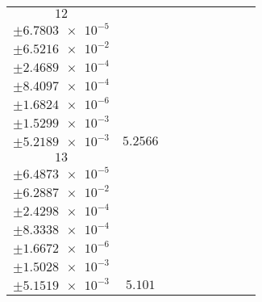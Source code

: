 \documentclass[8pt]{article}
\begin{document}
\begin{longtable}[l]{c c c c c c c c c}
$\num{12}$ & \begin{tabular}[c]{@{}c@{}}$\num{6.0296e-2}$ \\ $\pm\num{6.7803e-5}$\end{tabular} & \begin{tabular}[c]{@{}c@{}}$\num{-0.11125}$ \\ $\pm\num{6.5216e-2}$\end{tabular} & \begin{tabular}[c]{@{}c@{}}$\num{0.95528}$ \\ $\pm\num{2.4689e-4}$\end{tabular} & \begin{tabular}[c]{@{}c@{}}$\num{1.9819e+3}$ \\ $\pm\num{8.4097e-4}$\end{tabular} & \begin{tabular}[c]{@{}c@{}}$\num{3.9648}$ \\ $\pm\num{1.6824e-6}$\end{tabular} & \begin{tabular}[c]{@{}c@{}}$\num{1.1619}$ \\ $\pm\num{1.5299e-3}$\end{tabular} & \begin{tabular}[c]{@{}c@{}}$\num{4.2089}$ \\ $\pm\num{5.2189e-3}$\end{tabular} & $\num{5.2566}$\\
$\num{13}$ & \begin{tabular}[c]{@{}c@{}}$\num{5.9973e-2}$ \\ $\pm\num{6.4873e-5}$\end{tabular} & \begin{tabular}[c]{@{}c@{}}$\num{-0.1301}$ \\ $\pm\num{6.2887e-2}$\end{tabular} & \begin{tabular}[c]{@{}c@{}}$\num{3.3757}$ \\ $\pm\num{2.4298e-4}$\end{tabular} & \begin{tabular}[c]{@{}c@{}}$\num{1.9843e+3}$ \\ $\pm\num{8.3338e-4}$\end{tabular} & \begin{tabular}[c]{@{}c@{}}$\num{3.9697}$ \\ $\pm\num{1.6672e-6}$\end{tabular} & \begin{tabular}[c]{@{}c@{}}$\num{1.1597}$ \\ $\pm\num{1.5028e-3}$\end{tabular} & \begin{tabular}[c]{@{}c@{}}$\num{4.1909}$ \\ $\pm\num{5.1519e-3}$\end{tabular} & $\num{5.101}$\\
\bottomrule
\end{longtable}
\end{document}
